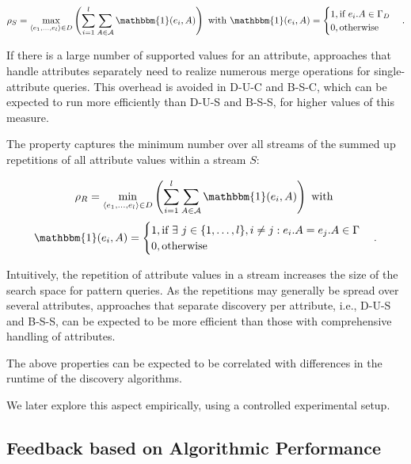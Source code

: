 \vspace{-1em}
\small
$$\rho_S = \max_{\langle e_1, \ldots, e_l\rangle \in
	D}\left(\sum_{i=1}^{l} \sum_{A\in
	\mathcal{A}}\mathbbm{1}(e_i,A)\right) \text{ with
	}\mathbbm{1}(e_i,A)=\begin{cases}
	1, \text{if } e_i.A \in \Gamma_{D}\\
	0,   \text{otherwise}
\end{cases}.$$
	

\normalsize
\noindent
If there is a large number of supported values for an attribute, approaches
that handle attributes separately need to realize numerous merge
operations for single-attribute queries. This overhead is avoided in D-U-C
and B-S-C, which can be expected to run more efficiently than
D-U-S and B-S-S, for higher values of this measure.

 The property
captures the minimum
number over all streams of the summed
up repetitions of all attribute values within a stream $S$:

\vspace{-1em}
\small
$$\rho_R = \min_{\langle e_1, \ldots, e_l\rangle \in
	D}\left(\sum_{i=1}^{l} \sum_{A\in
	\mathcal{A}}\mathbbm{1}(e_i,A)\right) \text{ with
	}
$$
\vspace{-.5em}
$$
	\mathbbm{1}(e_i,A)=\begin{cases}
	1, \text{if }  \exists \ j \in \{1,\ldots, l\}, i\neq j: e_i.A=e_j.A \in
	\Gamma\\
	0,   \text{otherwise}
\end{cases}.$$


\normalsize
\noindent
Intuitively, the repetition of attribute values in a stream increases the
size of the search space for pattern queries. As the repetitions may
generally be spread over several attributes, approaches that separate
discovery per attribute, i.e., D-U-S and B-S-S, can be expected to be more
efficient than those with comprehensive handling of attributes.

The above properties can be expected to be correlated with differences in
the runtime of the discovery algorithms.

We later explore this
aspect empirically, using a controlled experimental setup.



\subsection{Feedback based on Algorithmic Performance}
\label{sec:feedback}


